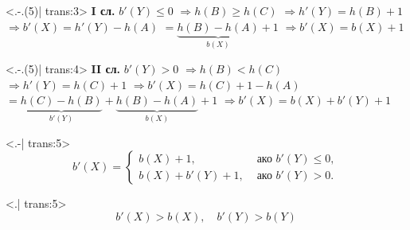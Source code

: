 \documentclass[alsotrans]{beamerswitch}
\begin{document}
\begin{frame}
\begin{overlayarea}{\textwidth}{20ex}
    \begin{onlyenv}<.-.(5)| trans:3>
      \textbf{I сл. }$b'(Y) \leq 0$
      \onslide<+-> $\Rightarrow h(B) \geq h(C)$
      \onslide<+-> $\Rightarrow h'(Y) = h(B) + 1$
      \onslide<+-> $\Rightarrow b'(X) = h'(Y) - h(A)$
      \onslide<+-> $ = \underbrace{h(B) - h(A)}_{b(X)} + 1$
      \onslide<+-> $\Rightarrow b'(X) = b(X) + 1$
    \end{onlyenv}
    \onslide<+->
    \begin{onlyenv}<.-.(5)| trans:4>
      \textbf{II сл.} $b'(Y) > 0$
      \onslide<+-> $\Rightarrow h(B) < h(C)$
      \onslide<+-> $\Rightarrow h'(Y) = h(C) + 1$
      \onslide<+-> $\Rightarrow b'(X) = h(C) + 1 - h(A)$
      \onslide<+-> $ = \underbrace{h(C) - h(B)}_{b'(Y)} + \underbrace{h(B) - h(A)}_{b(X)} + 1$
      \onslide<+-> $\Rightarrow b'(X) = b(X) + b'(Y) + 1$
    \end{onlyenv}
    \onslide<+->
    \begin{onlyenv}<.-| trans:5>
      \begin{equation*}
        b'(X) =
        \begin{cases}
          b(X) + 1,&\text{ ако }b'(Y) \leq 0,\\
          b(X) + b'(Y) + 1,&\text{ ако }b'(Y) > 0.
        \end{cases}
      \end{equation*}
    \end{onlyenv}
    \onslide<+->
    \begin{onlyenv}<.| trans:5>
      \vspace{-2ex}
      \begin{equation*}
        b'(X) > b(X), \quad b'(Y) > b(Y)
      \end{equation*}
    \end{onlyenv}
  \end{overlayarea}
\end{frame}
\end{document}
